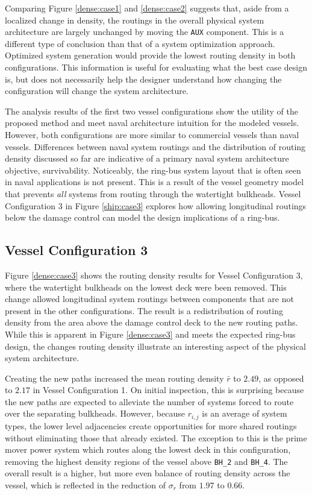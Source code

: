 \documentclass[preprint,12pt]{elsarticle}
\begin{document}
Comparing Figure \ref{dense:case1} and \ref{dense:case2} suggests that, aside from a localized change in density, the routings in the overall physical system architecture are largely unchanged by moving the \texttt{AUX} component. This is a different type of conclusion than that of a system optimization approach. Optimized system generation would provide the lowest routing density in both configurations. This information is useful for evaluating what the best case design is, but does not necessarily help the designer understand how changing the configuration will change the system architecture.

The analysis results of the first two vessel configurations show the utility of the proposed method and meet naval architecture intuition for the modeled vessels. However, both configurations are more similar to commercial vessels than naval vessels. Differences between naval system routings and the distribution of routing density discussed so far are indicative of a primary naval system architecture objective, survivability. Noticeably, the ring-bus system layout that is often seen in naval applications \citep{Chryssostomidis2015} is not present. This is a result of the vessel geometry model that prevents \textit{all} systems from routing through the watertight bulkheads. Vessel Configuration 3 in Figure \ref{ship:case3} explores how allowing longitudinal routings below the damage control can model the design implications of a ring-bus.

\subsection{Vessel Configuration 3}

Figure \ref{dense:case3} shows the routing density results for Vessel Configuration 3, where the watertight bulkheads on the lowest deck were been removed. This change allowed longitudinal system routings between components that are not present in the other configurations. The result is a redistribution of routing density from the area above the damage control deck to the new routing paths. While this is apparent in Figure \ref{dense:case3} and meets the expected ring-bus design, the changes routing density illustrate an interesting aspect of the physical system architecture.

Creating the new paths increased the mean routing density $\bar{r}$ to $2.49$, as opposed to $2.17$ in Vessel Configuration 1. On initial inspection, this is surprising because the new paths are expected to alleviate the number of systems forced to route over the separating bulkheads. However, because $r_{i,j}$ is an average of system types, the lower level adjacencies create opportunities for more shared routings without eliminating those that already existed. The exception to this is the prime mover power system which routes along the lowest deck in this configuration, removing the highest density regions of the vessel above \texttt{BH\_2} and \texttt{BH\_4}. The overall result is a higher, but more even balance of routing density across the vessel, which is reflected in the reduction of $\sigma_r$ from $1.97$ to $0.66$.
\end{document}
